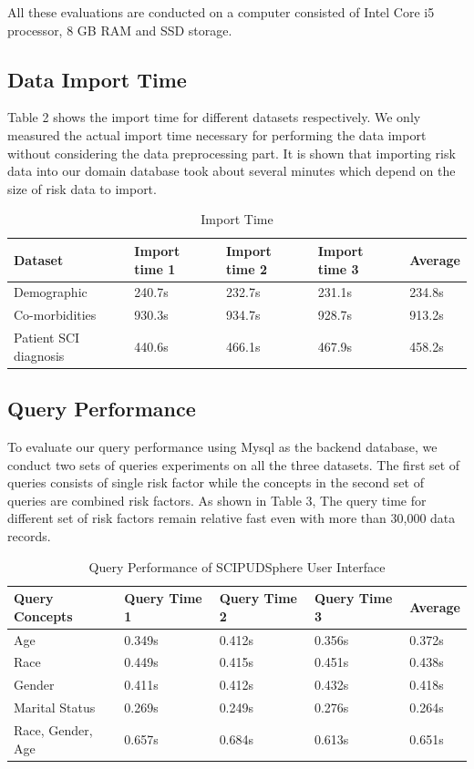 \documentclass{amia}
\begin{document}
All these evaluations are conducted on a computer consisted of Intel Core i5 processor, 8 GB RAM and SSD storage.
  
\subsection{Data Import Time}

Table 2 shows the import time for different datasets respectively. We only measured the actual import time necessary for performing the data import without considering the data preprocessing part. It is shown that importing risk data into our domain database took about several minutes which depend on the size of risk data to import.

\begin{table}[!ht]
\centering
\caption{Import Time}
  \begin{tabular}{|l|l|l|l|l|}
  \hline
    \textbf{Dataset}  & \textbf{Import time 1} & \textbf{Import time 2} & \textbf{Import time 3} & \textbf{Average} \\ \hline
    Demographic & 240.7s & 232.7s & 231.1s & 234.8s  \\ \hline
    Co-morbidities  & 930.3s & 934.7s & 928.7s & 913.2s  \\ \hline
    Patient SCI diagnosis  & 440.6s & 466.1s & 467.9s & 458.2s \\ \hline
  \end{tabular}
\end{table}

\subsection{Query Performance}
To evaluate our query performance using Mysql as the backend database, we conduct two sets of queries experiments on all the three datasets. The first set of queries consists of single risk factor while the concepts in the second set of queries are combined risk factors. As shown in Table 3, The query time for different set of risk factors remain relative fast even with more than 30,000 data records.

\begin{table}[!ht]
\centering
\caption{Query Performance of SCIPUDSphere User Interface}
  \begin{tabular}{|l|l|l|l|l|}
  \hline
    \textbf{Query Concepts}  & \textbf{Query Time 1} & \textbf{Query Time 2} & \textbf{Query Time 3} & \textbf{Average} \\ \hline
    Age & 0.349s & 0.412s & 0.356s & 0.372s \\ \hline
    Race & 0.449s & 0.415s & 0.451s & 0.438s \\ \hline
    Gender   & 0.411s & 0.412s & 0.432s & 0.418s \\ \hline
    Marital Status   & 0.269s & 0.249s & 0.276s & 0.264s \\ \hline
    Race, Gender, Age & 0.657s & 0.684s & 0.613s & 0.651s \\ \hline
  \end{tabular}
\end{table}
\end{document}

